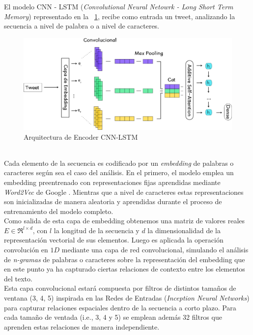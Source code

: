 	El modelo CNN - LSTM (\textit{Convolutional Neural Netowrk - Long Short Term Memory}) representado en la \figurename~\ref{cnn_lstm}, recibe como entrada un tweet, analizando la secuencia a nivel de palabra o a nivel de caracteres.
	\begin{figure}[!thb]
		\begin{center}
			\includegraphics[]{images/cnn_lstm.eps}
		\end{center}	
		\caption[CNN - LSTM]{Arquitectura de Encoder CNN-LSTM}
		\label{cnn_lstm}
	\end{figure}
	\\
	Cada elemento de la secuencia es codificado por un \textit{embedding} de palabras o caracteres según sea el caso del análisis. En el primero, el modelo emplea un embedding preentrenado con representaciones fijas aprendidas mediante \textit{Word2Vec} de Google \citep{DBLP:conf/nips/MikolovSCCD13}. Mientras que a nivel de caracteres estas representaciones son inicializadas de manera aleatoria y aprendidas durante el proceso de entrenamiento del modelo completo.
	\\
	Como salida de esta capa de embedding obtenemos una matriz de valores reales $E \in \Re^{l\times d}$, con $l$ la longitud de la secuencia y  $d$ la dimensionalidad de la representación vectorial de sus elementos. Luego es aplicada la operación convolución en $1D$ mediante una capa de red convolucional, simulando el análisis de \textit{n-gramas} de palabras o caracteres sobre la representación del embedding que en este punto ya ha capturado ciertas relaciones de contexto entre los elementos del texto.
	\\
	Esta capa convolucional estará compuesta por filtros de distintos tamaños de ventana (3, 4, 5) inspirada en las Redes de Entradas (\textit{Inception Neural Networks}) \citep{szegedy2014going} para capturar relaciones espaciales dentro de la secuencia a corto plazo. Para cada tamaño de ventada (i.e., 3, 4 y 5) se emplean además 32 filtros que aprenden estas relaciones de manera independiente. 
